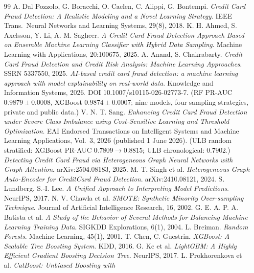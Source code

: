 \documentclass[11pt,a4paper]{article}
\begin{document}
\begin{thebibliography}{99}\small
{} A. Dal Pozzolo, G. Boracchi, O. Caelen, C. Alippi, G. Bontempi.
\emph{Credit Card Fraud Detection: A Realistic Modeling and a Novel Learning Strategy}.
IEEE Trans.\ Neural Networks and Learning Systems, 29(8), 2018.
 K. H. Ahmed, S. Axelsson, Y. Li, A. M. Sagheer.
\emph{A Credit Card Fraud Detection Approach Based on Ensemble Machine Learning Classifier with
Hybrid Data Sampling}. Machine Learning with Applications, 20:100675, 2025.
 A. Anand, S. Chakrabarty. \emph{Credit Card Fraud Detection and Credit Risk
Analysis: Machine Learning Approaches}. SSRN 5337550, 2025.
 \emph{AI-based credit card fraud detection: a machine learning approach with
model explainability on real-world data}. Knowledge and Information Systems, 2026.
DOI 10.1007/s10115-026-02773-7. (RF PR-AUC $0.9879\pm0.0008$, XGBoost $0.9874\pm0.0007$;
nine models, four sampling strategies, private and public data.)
 V. N. T. Sang. \emph{Enhancing Credit Card Fraud Detection under Severe Class
Imbalance using Cost-Sensitive Learning and Threshold Optimization}. EAI Endorsed Transactions on
Intelligent Systems and Machine Learning Applications, Vol.\ 3, 2026 (published 1 June 2026).
(ULB random stratified: XGBoost PR-AUC $0.7809 \to 0.8815$; ULB chronological: $0.7902$.)
 \emph{Detecting Credit Card Fraud via Heterogeneous Graph Neural Networks with
Graph Attention}. arXiv:2504.08183, 2025.
 M. T. Singh et al. \emph{Heterogeneous Graph Auto-Encoder for CreditCard Fraud
Detection}. arXiv:2410.08121, 2024.
 S. Lundberg, S.-I. Lee. \emph{A Unified Approach to Interpreting Model
Predictions}. NeurIPS, 2017.
 N. V. Chawla et al. \emph{SMOTE: Synthetic Minority Over-sampling Technique}.
Journal of Artificial Intelligence Research, 16, 2002.
 G. E. A. P. A. Batista et al. \emph{A Study of the Behavior of Several Methods
for Balancing Machine Learning Training Data}. SIGKDD Explorations, 6(1), 2004.
 L. Breiman. \emph{Random Forests}. Machine Learning, 45(1), 2001.
 T. Chen, C. Guestrin. \emph{XGBoost: A Scalable Tree Boosting System}. KDD, 2016.
 G. Ke et al. \emph{LightGBM: A Highly Efficient Gradient Boosting Decision Tree}.
NeurIPS, 2017.
 L. Prokhorenkova et al. \emph{CatBoost: Unbiased Boosting with
}
\end{thebibliography}
\end{document}

